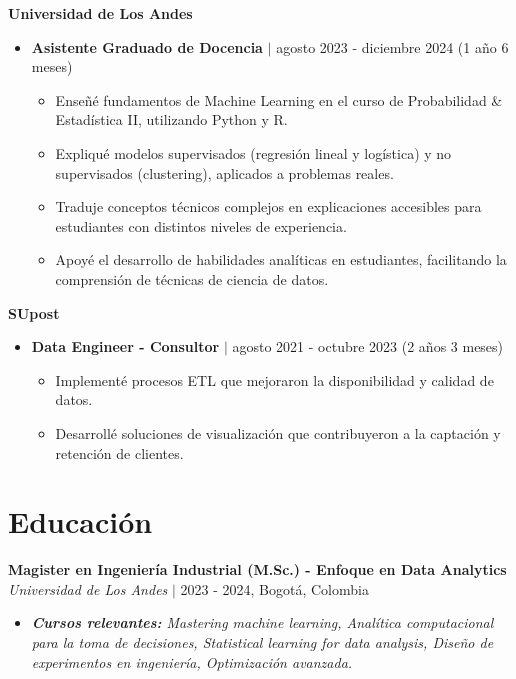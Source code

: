 \documentclass[9pt, letterpaper]{extarticle}
\begin{document}
        \vspace{10pt}

        \noindent \textbf{Universidad de Los Andes}

        \begin{itemize}[leftmargin=15pt, nosep]
            \item \textbf{Asistente Graduado de Docencia} $\vert$ agosto 2023 - diciembre 2024 (1 año 6 meses)
            \begin{itemize}[leftmargin=15pt, label={--}, nosep]
                \item Enseñé fundamentos de Machine Learning en el curso de Probabilidad \& Estadística II, utilizando Python y R.
                \item Expliqué modelos supervisados (regresión lineal y logística) y no supervisados (clustering), aplicados a problemas reales.
                \item Traduje conceptos técnicos complejos en explicaciones accesibles para estudiantes con distintos niveles de experiencia.
                \item Apoyé el desarrollo de habilidades analíticas en estudiantes, facilitando la comprensión de técnicas de ciencia de datos.
            \end{itemize}
        \end{itemize}
        
        \vspace{10pt}

        \noindent \textbf{SUpost}

        \begin{itemize}[leftmargin=15pt, nosep]
            \item \textbf{Data Engineer - Consultor} $\vert$ agosto 2021 - octubre 2023 (2 años 3 meses)
            \begin{itemize}[leftmargin=15pt, label={--}, nosep]
                \item Implementé procesos ETL que mejoraron la disponibilidad y calidad de datos.
                \item Desarrollé soluciones de visualización que contribuyeron a la captación y retención de clientes.
            \end{itemize}
        \end{itemize}

    \section*{Educación}
        \textbf{Magister en Ingeniería Industrial (M.Sc.) - Enfoque en Data Analytics} \\
        \textit{Universidad de Los Andes} $\vert$ 2023 - 2024, Bogotá, Colombia
        \begin{itemize}[leftmargin=15pt, nosep]
            \item \textit{\textbf{Cursos relevantes:} Mastering machine learning, Analítica computacional para la toma de decisiones, Statistical learning for data analysis, Diseño de experimentos en ingeniería, Optimización avanzada.}
        \end{itemize}
\end{document}

